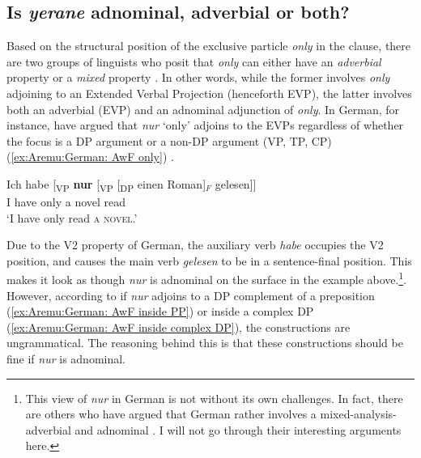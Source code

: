 \documentclass[output=paper,colorlinks,citecolor=brown,draftmode
]{langscibook}
\begin{document}
\subsection{Is \textit{yerane} adnominal, adverbial or both?}
\largerpage[2]
Based on the structural position of the exclusive particle \textit{only} in the clause, there are two groups of linguists who posit that \textit{only} can either have an \textit{adverbial} property \citep{jacobs1983fokus, jacobs1986syntax, buring2001syntax} or a \textit{mixed} property \citep{bayer1996directionality, bayer1999bound, bayer2018criterial, reis2005syntax, barbiers2014syntactic, smeets2018reconstructing}. In other words, while the former involves \textit{only} adjoining to an Extended Verbal Projection (henceforth EVP), the latter involves both an adverbial (EVP) and an adnominal adjunction of \textit{only}. In German, for instance, \citet{buring2001syntax} have argued that \textit{nur} `only' adjoins to the EVPs regardless of whether the focus is a DP argument or a non-DP argument (VP, TP, CP) (\ref{ex:Aremu:German: AwF only}) \citep[see also][]{Mursell2021ISagreement}.


\ea \label{ex:Aremu:German: AwF only} %
\gll Ich habe [\textsubscript{VP} \textbf{nur} [\textsubscript{VP} [\textsubscript{DP} einen Roman]$_F$ gelesen]]\\
     I have {} only {} {} a novel read\\
\glt `I have only read \textsc{a novel}.' \citep[][231]{buring2001syntax}
\z

Due to the V2 property of German, the auxiliary verb \textit{habe} occupies the V2 position, and causes the main verb \textit{gelesen} to be in a sentence-final position. This makes it look as though \textit{nur} is adnominal on the surface in the example above.\footnote{This view of \textit{nur} in German is not without its own challenges. In fact, there are others who have argued that German rather involves a mixed-analysis- adverbial and adnominal \citep[see][among others]{reis2005syntax, meyer2009pragmatic, bayer1996directionality, bayer2018criterial, hole2015distributed, smeets2018reconstructing}. I will not go through their interesting arguments here.}. However, according to \cite[][233]{buring2001syntax} if \textit{nur} adjoins to a DP complement of a preposition (\ref{ex:Aremu:German: AwF inside PP}) or inside a complex DP (\ref{ex:Aremu:German: AwF inside complex DP}), the constructions are ungrammatical. The reasoning behind this is that these constructions should be fine if \textit{nur} is adnominal.
\end{document}

